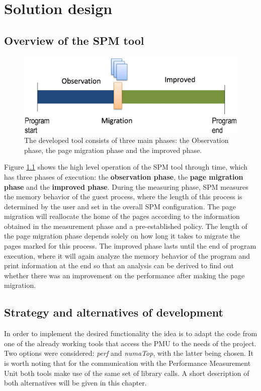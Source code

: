 \chapter{Solution design}\label{chapter:soldesign}


\section{Overview of the SPM tool}\label{section:ovv-spm}


\begin{figure}
	\centering
		\includegraphics[width=.6\textwidth]{figures/spm-principle.eps}
		\caption[Three phases of execution of the SPM development]{The developed tool consists of three main phases: the Observation phase, the page migration phase and the improved phase.}
		\label{fig:sprinciple}
\end{figure}

Figure \ref{fig:sprinciple} shows the high level operation of the SPM tool through time, which has three phases of execution: the \textbf{observation phase}, the \textbf{page migration phase} and the \textbf{improved phase}. During the measuring phase, SPM measures the memory behavior of the guest process, where the length of this process is determined by the user and set in the overall SPM configuration. The page migration will reallocate the home of the pages according to the information obtained in the measurement phase and a pre-established policy. The length of the page migration phase depends solely on how long it takes to migrate the pages marked for this process. The improved phase lasts until the end of program execution, where it will again analyze the memory behavior of the program and print information at the end so that an analysis can be derived to find out whether there was an improvement on the performance after making the page migration.



\section{Strategy and alternatives of development}\label{section:strat}
In order to implement the desired functionality the idea is to adapt the code from one of the already working tools that access the PMU to the needs of the project. Two options were considered: \textit{perf} and \textit{numaTop}, with the latter being chosen. It is worth noting that for the communication with the Performance Measurement Unit both tools make use of the same set of library calls. A short description of both alternatives will be given in this chapter.


